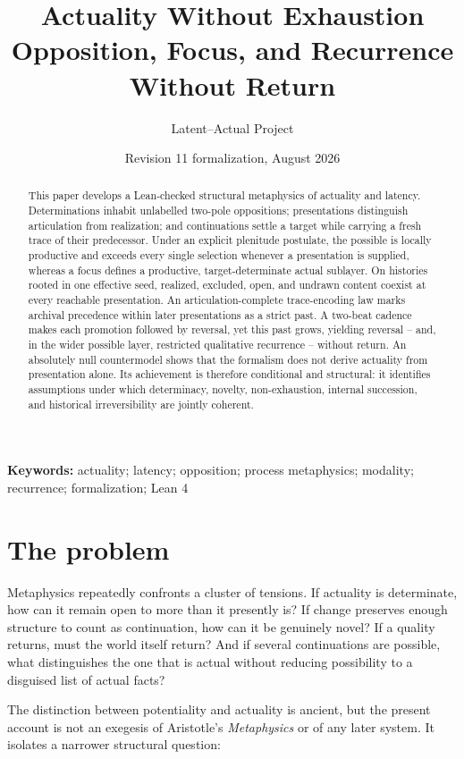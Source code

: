 \documentclass[11pt]{article}
\title{\textbf{Actuality Without Exhaustion}\\[0.45em]
  \large Opposition, Focus, and Recurrence Without Return}
\author{Latent--Actual Project}
\date{Revision 11 formalization, August 2026}
\theoremstyle{definition}
\theoremstyle{remark}
\begin{document}
\maketitle

\begin{abstract}
This paper develops a Lean-checked structural metaphysics of actuality and
latency. Determinations inhabit unlabelled two-pole oppositions; presentations
distinguish articulation from realization; and continuations settle a target
while carrying a fresh trace of their predecessor. Under an explicit
plenitude postulate, the possible is locally productive and exceeds every
single selection whenever a presentation is supplied, whereas a focus defines
a productive, target-determinate actual sublayer. On histories rooted in one
effective seed, realized, excluded, open, and undrawn content coexist at every
reachable presentation.
An articulation-complete trace-encoding law marks archival precedence within later
presentations as a strict past. A two-beat cadence makes each promotion
followed by reversal, yet this past grows, yielding reversal -- and,
in the wider possible layer, restricted qualitative recurrence -- without
return. An absolutely null countermodel shows that the formalism does not
derive actuality from presentation alone. Its achievement is therefore
conditional and structural: it identifies assumptions under which determinacy,
novelty, non-exhaustion, internal succession, and historical irreversibility
are jointly coherent.
\end{abstract}

\noindent\textbf{Keywords:}
actuality; latency; opposition; process metaphysics; modality; recurrence;
formalization; Lean 4

\tableofcontents
\newpage

\section{The problem}

Metaphysics repeatedly confronts a cluster of tensions. If actuality is
determinate, how can it remain open to more than it presently is? If change
preserves enough structure to count as continuation, how can it be genuinely
novel? If a quality returns, must the world itself return? And if several
continuations are possible, what distinguishes the one that is actual without
reducing possibility to a disguised list of actual facts?

The distinction between potentiality and actuality is ancient, but the present
account is not an exegesis of Aristotle's \emph{Metaphysics} \cite{Aristotle2016}
or of any later system. It isolates a narrower structural question:
\end{document}
